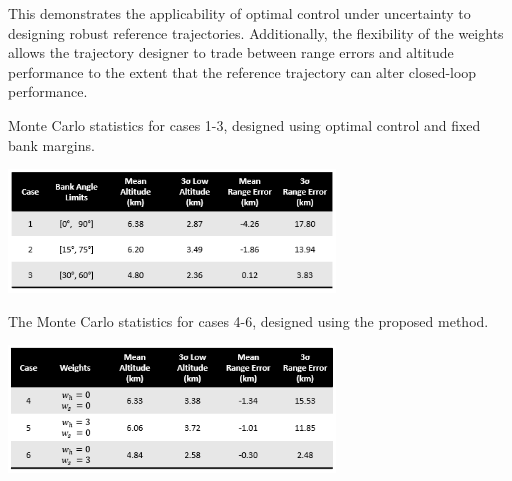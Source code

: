 \documentclass[journal ]{new-aiaa}
\begin{document}
This demonstrates the applicability of optimal control under uncertainty to designing robust reference trajectories. Additionally, the flexibility of the weights allows the trajectory designer to trade between range errors and altitude performance to the extent that the reference trajectory can alter closed-loop performance. 
\begin{table}[h!]
	\centering
	\caption{Monte Carlo statistics for cases 1-3, designed using optimal control and fixed bank margins.}
	\includegraphics[width=0.65\textwidth]{ddp/table_deterministic}
	\label{table_deterministic}
\end{table}
\begin{table}[h!]
	\centering
	\caption{The Monte Carlo statistics for cases 4-6, designed using the proposed method.}
	\includegraphics[width=0.65\textwidth]{ddp/table_robust} %
	\label{table_robust}
\end{table}
\end{document}
